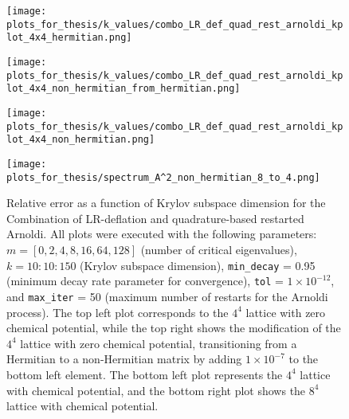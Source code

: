 \begin{figure}[H]
    \centering
    \begin{minipage}{0.45\textwidth}
        \centering
        \texttt{[image: plots\_for\_thesis/k\_values/combo\_LR\_def\_quad\_rest\_arnoldi\_kplot\_4x4\_hermitian.png]} %
    \end{minipage}%
    \hspace{0.02\textwidth} %
    \begin{minipage}{0.45\textwidth}
        \centering
        \texttt{[image: plots\_for\_thesis/k\_values/combo\_LR\_def\_quad\_rest\_arnoldi\_kplot\_4x4\_non\_hermitian\_from\_hermitian.png]} %
    \end{minipage}
    
    \vspace{0.02\textwidth} %
    
    \begin{minipage}{0.45\textwidth}
        \centering
        \texttt{[image: plots\_for\_thesis/k\_values/combo\_LR\_def\_quad\_rest\_arnoldi\_kplot\_4x4\_non\_hermitian.png]} %
    \end{minipage}%
    \hspace{0.02\textwidth} %
    \begin{minipage}{0.45\textwidth}
        \centering
        \texttt{[image: plots\_for\_thesis/spectrum\_A^2\_non\_hermitian\_8\_to\_4.png]} %
    \end{minipage}
    
    \caption{\small Relative error as a function of Krylov subspace dimension for the Combination of LR-deflation and quadrature-based restarted Arnoldi. All plots were executed with the following parameters: $m = [0, 2, 4, 8, 16, 64, 128]$ (number of critical eigenvalues), $k = 10:10:150$ (Krylov subspace dimension), \texttt{min\_decay} = 0.95 (minimum decay rate parameter for convergence), \texttt{tol} = $1 \times 10^{-12}$, and \texttt{max\_iter} = 50 (maximum number of restarts for the Arnoldi process). The top left plot corresponds to the $4^4$ lattice with zero chemical potential, while the top right shows the modification of the $4^4$ lattice with zero chemical potential, transitioning from a Hermitian to a non-Hermitian matrix by adding $1 \times 10^{-7}$ to the bottom left element. The bottom left plot represents the $4^4$ lattice with chemical potential, and the bottom right plot shows the $8^4$ lattice with chemical potential.}
    \label{fig:combo_LR+restarted_arnoldi_k_plot}
\end{figure}

